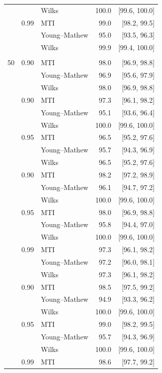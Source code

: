 \begin{longtable}{@{}rrlrr@{}}
 &  & Wilks & 100.0 & [99.6, 100.0] \\
\addlinespace[0.2em]
1000 & 0.99 & MTI & 99.0 & [98.2, 99.5] \\
 &  & Young--Mathew & 95.0 & [93.5, 96.3] \\
 &  & Wilks & 99.9 & [99.4, 100.0] \\
\addlinespace[0.2em]
\multicolumn{5}{@{}l}{\textit{Exponential}}\\
50 & 0.90 & MTI & 98.0 & [96.9, 98.8] \\
 &  & Young--Mathew & 96.9 & [95.6, 97.9] \\
 &  & Wilks & 98.0 & [96.9, 98.8] \\
\addlinespace[0.2em]
100 & 0.90 & MTI & 97.3 & [96.1, 98.2] \\
 &  & Young--Mathew & 95.1 & [93.6, 96.4] \\
 &  & Wilks & 100.0 & [99.6, 100.0] \\
\addlinespace[0.2em]
100 & 0.95 & MTI & 96.5 & [95.2, 97.6] \\
 &  & Young--Mathew & 95.7 & [94.3, 96.9] \\
 &  & Wilks & 96.5 & [95.2, 97.6] \\
\addlinespace[0.2em]
500 & 0.90 & MTI & 98.2 & [97.2, 98.9] \\
 &  & Young--Mathew & 96.1 & [94.7, 97.2] \\
 &  & Wilks & 100.0 & [99.6, 100.0] \\
\addlinespace[0.2em]
500 & 0.95 & MTI & 98.0 & [96.9, 98.8] \\
 &  & Young--Mathew & 95.8 & [94.4, 97.0] \\
 &  & Wilks & 100.0 & [99.6, 100.0] \\
\addlinespace[0.2em]
500 & 0.99 & MTI & 97.3 & [96.1, 98.2] \\
 &  & Young--Mathew & 97.2 & [96.0, 98.1] \\
 &  & Wilks & 97.3 & [96.1, 98.2] \\
\addlinespace[0.2em]
1000 & 0.90 & MTI & 98.5 & [97.5, 99.2] \\
 &  & Young--Mathew & 94.9 & [93.3, 96.2] \\
 &  & Wilks & 100.0 & [99.6, 100.0] \\
\addlinespace[0.2em]
1000 & 0.95 & MTI & 99.0 & [98.2, 99.5] \\
 &  & Young--Mathew & 95.7 & [94.3, 96.9] \\
 &  & Wilks & 100.0 & [99.6, 100.0] \\
\addlinespace[0.2em]
1000 & 0.99 & MTI & 98.6 & [97.7, 99.2] \\

\end{longtable}
